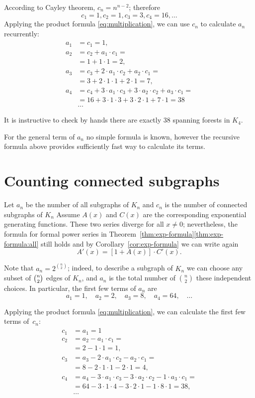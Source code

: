 According to Cayley theorem, $c_n=n^{n-2}$;
therefore 
\[c_1=1, c_2=1, c_3=3, c_4=16,\dots\]
Applying the product formula \ref{eq:multiplication}, we can use $c_n$ to calculate $a_n$ recurrently:
\begin{align*}
a_1&=c_1=1,
\\
a_2&=c_2+a_1\cdot c_1=
\\&=1+1\cdot 1=2,
\\
a_3&=c_3+2\cdot a_1\cdot c_2+ a_2\cdot c_1=
\\
&=3+2\cdot1\cdot 1+2\cdot 1=7,
\\
a_4&=c_4+3\cdot a_1\cdot c_3+3\cdot a_2\cdot c_2+a_3\cdot c_1=
\\&=16+3\cdot 1\cdot 3+3\cdot 2\cdot 1+7\cdot 1=38
\\
&\dots
\end{align*}

It is instructive to check by hands there are exactly $38$ spanning forests in $K_4$.

For the general term of $a_n$ no simple formula is known,
however the recursive formula above provides sufficiently fast way to calculate its terms.


\section*{Counting connected subgraphs}

Let $a_n$ be the number of all subgraphs of $K_n$ and $c_n$ is the number of connected subgraphs of $K_n$
Assume $A(x)$ and $C(x)$ are the corresponding exponential generating functions.
These two series diverge for all $x\ne 0$;
nevertheless, the formula for formal power series in Theorem~\ref{thm:exp-formula}\ref{thm:exp-formula:all}
still holds and by Corollary~\ref{cor:exp-formula} we can write again
\[A'(x)=[1+A(x)]\cdot C'(x).\]

Note that $a_n=2^{\binom n2}$;
indeed, to describe a subgraph of $K_n$ we can choose any subset of $\tbinom n2$ edges of $K_n$, and $a_n$ is the total number of $\binom n2$ these independent choices.
In particular, the first few terms of $a_n$ are
\[a_1=1,\quad a_2=2,\quad a_3=8,\quad a_4=64,\quad\dots\]

Applying the product formula \ref{eq:multiplication}, we can calculate the first few terms of~$c_n$:
\begin{align*}
c_1&=a_1=1
\\
c_2&=a_2-a_1\cdot c_1=
\\
&=2-1\cdot 1=1,
\\
c_3&=a_3-2\cdot a_1\cdot c_2- a_2\cdot c_1=
\\
&=8-2\cdot1\cdot 1-2\cdot 1=4,
\\
c_4&=a_4-3\cdot a_1\cdot c_3-3\cdot a_2\cdot c_2-1\cdot a_3\cdot c_1=
\\
&=64-3\cdot 1\cdot 4-3\cdot 2\cdot 1-1\cdot 8\cdot 1=38,
\\
&\dots
\end{align*}

